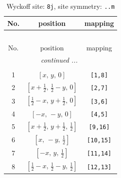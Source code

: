 \documentclass[fleqn,8pt]{jsarticle}
\begin{document}
\begin{longtable}{ccc}
\caption{Wyckoff site: {\tt 8j}, site symmetry: {\tt ..m}}
 \\
 \hline \hline
No. & position & mapping \\ \hline \endfirsthead

\multicolumn{2}{l}{\tablename\ \thetable{}} \\
 \hline \hline
No. & position & mapping \\ \hline \endhead

 \hline \hline
\multicolumn{2}{r}{\footnotesize\it continued ...} \\ \endfoot

 \hline \hline
\multicolumn{2}{r}{} \\ \endlastfoot

1 & $\left[ x,\, y,\, 0 \right]$ & {\tt [1,8]} \\ \hline
2 & $\left[ x + \frac{1}{2},\, \frac{1}{2} - y,\, 0 \right]$ & {\tt [2,7]} \\ \hline
3 & $\left[ \frac{1}{2} - x,\, y + \frac{1}{2},\, 0 \right]$ & {\tt [3,6]} \\ \hline
4 & $\left[ - x,\, - y,\, 0 \right]$ & {\tt [4,5]} \\ \hline
5 & $\left[ x + \frac{1}{2},\, y + \frac{1}{2},\, \frac{1}{2} \right]$ & {\tt [9,16]} \\ \hline
6 & $\left[ x,\, - y,\, \frac{1}{2} \right]$ & {\tt [10,15]} \\ \hline
7 & $\left[ - x,\, y,\, \frac{1}{2} \right]$ & {\tt [11,14]} \\ \hline
8 & $\left[ \frac{1}{2} - x,\, \frac{1}{2} - y,\, \frac{1}{2} \right]$ & {\tt [12,13]} \\
\end{longtable}
\renewcommand{\arraystretch}{1.2}
\end{document}
